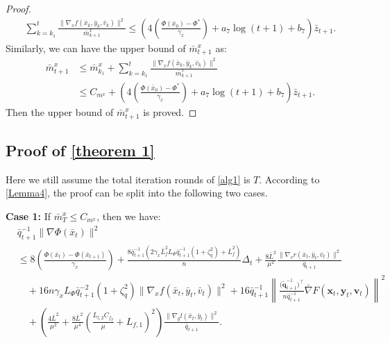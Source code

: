 \documentclass{article}
\theoremstyle{plain}
\theoremstyle{definition}
\theoremstyle{remark}
\begin{document}
\begin{proof}
\begin{align}
\sum_{k=k_1}^t  \frac{\|\nabla_x f(\bar{x}_k, \bar{y}_k, \bar{v}_k)\|^2}{\bar{m}^x_{k+1}}
\leq \left(4\left(\frac{\Phi(\bar{x}_{0})-\Phi^*}{\gamma_x}\right)+a_7\log(t+1)+b_7\right)\bar{z}_{t+1}.\label{eq136}
\end{align}
Similarly, we can have the upper bound of $\bar{m}^x_{t+1}$ as:
\begin{align}
   \bar{m}^x_{t+1} &\leq \bar{m}^x_{k_1} + \sum_{k=k_1}^t \frac{\|\nabla_x f(\bar{x}_k, \bar{y}_k, \bar{v}_k)\|^2}{\bar{m}^x_{k+1}}\nonumber\\
&\leq C_{m^x} + {\left(4\left(\frac{\Phi(\bar{x}_{0})-\Phi^*}{\gamma_x}\right)+a_7\log(t+1)+b_7\right)\bar{z}_{t+1}}. \label{eq137}
\end{align}
Then the upper bound of $\bar{m}^x_{t+1}$ is proved.
\end{proof}

\subsection{Proof of \cref{theorem 1}}
Here we still assume the total iteration rounds of \cref{alg1} is $T$. According to \cref{Lemma4}, the proof can be split into the following two cases.

\textbf{Case 1:} If $\bar{m}^x_{T} \leq C_{m^x}$, then we have:
\begin{align}
&{ \bar{q}_{t+1}^{-1}}\|\nabla \Phi(\bar{x}_t)\|^2\nonumber\\
&\leq8\left(\frac{\Phi(\bar{x}_t)-\Phi(\bar{x}_{t+1})}{\gamma_x}\right)+\frac{8\bar{q}_{t+1}^{-1}(2\gamma_x \bar{L}_{f}^2L_\Phi \bar{q}_{t+1}^{-1} \left(1 +\zeta_q^2\right)+\bar{L}_{f}^2)}{n} \Delta_t+ \frac{8\bar{L}^2}{\mu^2} \frac{\|\nabla_v r(\bar{x}_t, \bar{y}_t, \bar{v}_t)\|^2}{\bar{q}_{t+1}} \nonumber\\
&\quad +{16n\gamma_x L_\Phi \bar{q}_{t+1}^{-2} \left(1 +\zeta_q^2\right)}{\|\nabla_x f(\bar{x}_t, \bar{y}_t, \bar{v}_t)\|^2}
+ 16 \bar{q}_{t+1}^{-1}  \left\| \frac{\big(\tilde{\mathbf{q}}_{t+1}^{-1}\big)^\top}{n\bar{q}_{t+1}^{-1}} \bar{\nabla} F(\mathbf{x}_t, \mathbf{y}_t, \mathbf{v}_t) \right\|^2 \nonumber \\
&\quad +\left( \frac{4\bar{L}^2}{\mu^2} + \frac{8\bar{L}^2}{\mu^4} \left( \frac{L_{l,2} C_{f_y}}{\mu} + L_{f,1} \right)^2 \right) \frac{\|\nabla_y l(\bar{x}_t, \bar{y}_t)\|^2}{\bar{q}_{t+1}}.\label{eq138}
\end{align}
\end{document}
